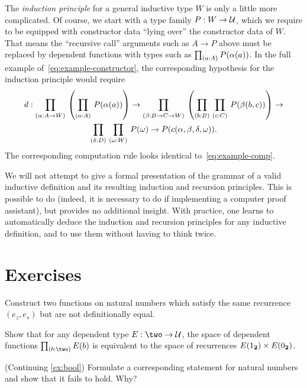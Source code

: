 The \emph{induction principle} for a general inductive type $W$ is only a little more complicated.
Of course, we start with a type family $P:W\to\mathcal{U}$, which we require to be equipped with constructor data ``lying over'' the constructor data of $W$.
That means the ``recursive call'' arguments such as $A\to P$ above must be replaced by dependent functions with types such as $\prd{a:A} P(\alpha(a))$.
In the full example of~\eqref{eq:example-constructor}, the corresponding hypothesis for the induction principle would require
\begin{multline*}
d : \dprd{\alpha:A\to W}\left(\dprd{a:A} P(\alpha(a))\right) \to
\dprd{\beta:B\to C\to W} \left(\dprd{b:B}{c:C} P(\beta(b,c))\right) \to\\
\dprd{\delta:D}
\dprd{\omega:W} P(\omega) \to
P(c(\alpha,\beta,\delta,\omega)).
\end{multline*}
The corresponding computation rule looks identical to~\eqref{eq:example-comp}.

We will not attempt to give a formal presentation of the grammar of a valid inductive definition and its resulting induction and recursion principles.
This is possible to do (indeed, it is necessary to do if implementing a computer proof assistant), but provides no additional insight.
With practice, one learns to automatically deduce the induction and recursion principles for any inductive definition, and to use them without having to think twice.


\section*{Exercises}

\begin{ex}
  Construct two functions on natural numbers which satisfy the same recurrence $(e_z, e_s)$ but are not definitionally equal.
\end{ex}

\begin{ex}\label{ex:bool}
Show that for any dependent type $E : \two \to \type$, the space of dependent functions $\prd{b : \two} E(b)$ is equivalent to the space of recurrences $ E(1_{\mathbf{2}}) \times E(0_{\mathbf{2}})$. 
\end{ex}

\begin{ex}
  (Continuing \autoref{ex:bool}) Formulate a corresponding statement for natural numbers and show that it fails to hold. Why?
\end{ex}

